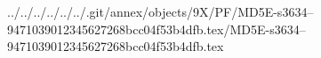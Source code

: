 ../../../../../../.git/annex/objects/9X/PF/MD5E-s3634--9471039012345627268bcc04f53b4dfb.tex/MD5E-s3634--9471039012345627268bcc04f53b4dfb.tex
